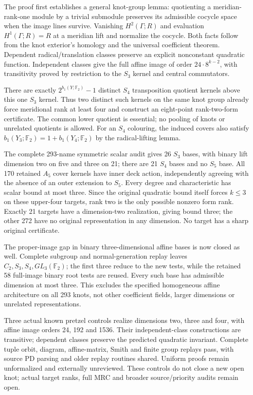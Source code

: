 \documentclass[11pt]{article}
\newcommand{\F}{\mathbb F}
\begin{document}
The proof first establishes a general knot-group lemma:
quotienting a meridian-rank-one module by a trivial submodule
preserves its admissible cocycle space when the image lines
survive. Vanishing $H^2(\Gamma;R)$ and evaluation
$H^1(\Gamma;R)=R$ at a meridian lift and normalize the cocycle.
Both facts follow from the knot exterior's homology and the
universal coefficient theorem. Dependent radical/translation
classes preserve an explicit nonconstant quadratic function.
Independent classes give the full affine image of order
$24\cdot8^{k-2}$, with transitivity proved by restriction to
the $S_3$ kernel and central commutators.

There are exactly $2^{b_1(Y;\F_2)}-1$ distinct $S_4$
transposition quotient kernels above this one $S_3$ kernel.
Thus two distinct such kernels on the same knot group already
force meridional rank at least four and construct an eight-point
rank-two-form certificate. The common lower quotient is essential;
no pooling of knots or unrelated quotients is allowed. For an
$S_4$ colouring, the induced covers also satisfy
$b_1(Y_3;\F_2)=1+b_1(Y_4;\F_2)$ by the radical-lifting lemma.

The complete 293-name symmetric scalar audit gives 26 $S_3$
bases, with binary lift dimension two on five and three on 21;
there are 21 $S_4$ bases and no $S_5$ base. All 170 retained
$A_5$ cover kernels have inner deck action, independently
agreeing with the absence of an outer extension to $S_5$.
Every degree and characteristic has scalar bound at most three.
Since the original quadratic bound itself forces $k\le3$ on
these upper-four targets, rank two is the only possible nonzero
form rank. Exactly 21 targets have a dimension-two realization,
giving bound three; the other 272 have no original representation
in any dimension. No target has a sharp original certificate.

The proper-image gap in binary three-dimensional affine bases
is now closed as well. Complete subgroup and normal-generation
replay leaves $C_2,S_3,S_4,GL_3(\F_2)$; the first three reduce
to the new tests, while the retained 58 full-image binary root
tests are reused. Every such base has admissible dimension at
most three. This excludes the specified homogeneous affine
architecture on all 293 knots, not other coefficient fields,
larger dimensions or unrelated representations.

Three actual known pretzel controls realize dimensions two,
three and four, with affine image orders 24, 192 and 1536.
Their independent-class constructions are transitive; dependent
classes preserve the predicted quadratic invariant. Complete
tuple orbit, diagram, affine-matrix, Smith and finite group
replays pass, with source PD parsing and older replay routines
shared. Uniform proofs remain unformalized and externally
unreviewed. These controls do not close a new open knot; actual
target ranks, full MRC and broader source/priority audits remain
open.
\end{document}
